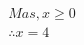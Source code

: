 \documentclass[preview]{standalone}
\begin{document}
\begin{align*}
Mas, x \geq 0 \\ \therefore x = 4
\end{align*}
\end{document}
